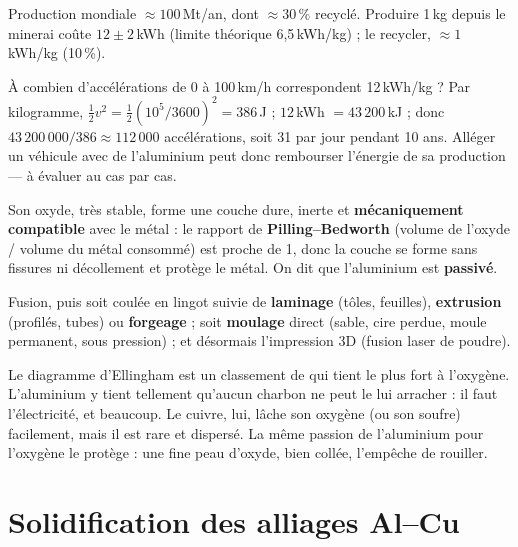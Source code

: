 
\begin{propbox}[title={L'énergie de l'aluminium}]
Production mondiale $\approx 100$\,Mt/an, dont $\approx 30\,\%$ recyclé. Produire 1\,kg depuis le
minerai coûte $12 \pm 2$\,kWh (limite théorique 6,5\,kWh/kg) ; le recycler, $\approx 1$\,kWh/kg
(10\,\%).
\end{propbox}

\begin{exbox}[title=Le petit exercice des diapositives]
À combien d'accélérations de 0 à 100\,km/h correspondent 12\,kWh/kg ? Par kilogramme,
$\frac12 v^2 = \frac12(10^5/3600)^2 = 386$\,J ; $12$\,kWh $= 43\,200$\,kJ ; donc
$43\,200\,000/386 \approx 112\,000$ accélérations, soit 31 par jour pendant 10 ans. Alléger un
véhicule avec de l'aluminium peut donc rembourser l'énergie de sa production --- à évaluer au
cas par cas.
\end{exbox}

\begin{propbox}[title={Pourquoi l'aluminium ne rouille pas}]
Son oxyde, très stable, forme une couche dure, inerte et \textbf{mécaniquement compatible} avec
le métal : le rapport de \textbf{Pilling--Bedworth} (volume de l'oxyde / volume du métal
consommé) est proche de 1, donc la couche se forme sans fissures ni décollement et protège le
métal. On dit que l'aluminium est \textbf{passivé}.
\end{propbox}

\begin{rembox}[title=Mise en forme]
Fusion, puis soit coulée en lingot suivie de \textbf{laminage} (tôles, feuilles),
\textbf{extrusion} (profilés, tubes) ou \textbf{forgeage} ; soit \textbf{moulage} direct
(sable, cire perdue, moule permanent, sous pression) ; et désormais l'impression 3D (fusion
laser de poudre).
\end{rembox}

\begin{goatbox}
Le diagramme d'Ellingham est un classement de \og qui tient le plus fort à l'oxygène\fg{}.
L'aluminium y tient tellement qu'aucun charbon ne peut le lui arracher : il faut l'électricité,
et beaucoup. Le cuivre, lui, lâche son oxygène (ou son soufre) facilement, mais il est rare et
dispersé. La même passion de l'aluminium pour l'oxygène le protège : une fine peau d'oxyde,
bien collée, l'empêche de rouiller.
\end{goatbox}

\section{Solidification des alliages Al--Cu}

